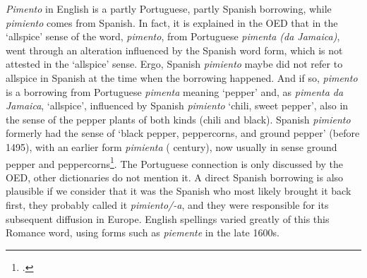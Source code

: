 \textit{Pimento} in English is a partly Portuguese, partly Spanish borrowing, while \textit{pimiento} comes from Spanish. In fact, it is explained in the \gls{OED} that in the `allspice' sense of the word, \textit{pimento}, from Portuguese \textit{pimenta (da Jamaica)}, went through an alteration influenced by the Spanish word form, which is not attested in the `allspice' sense. Ergo, Spanish \textit{pimiento} maybe did not refer to allspice in Spanish at the time when the borrowing happened. And if so, \textit{pimento} is a borrowing from Portuguese \textit{pimenta} meaning `pepper' and, as \textit{pimenta da Jamaica}, `allspice', influenced by Spanish \textit{pimiento} `chili, sweet pepper', also in the sense of the pepper plants of both kinds (chili and black). Spanish \textit{pimiento} formerly had the sense of `black pepper, peppercorns, and ground pepper' (before 1495), with an earlier form \textit{pimienta} ( century), now usually in sense ground pepper and peppercorns\footcite[pimento]{oed}. The Portuguese connection is only discussed by the \gls{OED}, other dictionaries do not mention it. A direct Spanish borrowing is also plausible if we consider that it was the Spanish who most likely brought it back first, they probably called it \textit{pimiento/-a}, and they were responsible for its subsequent diffusion in Europe. English spellings varied greatly of this this Romance word, using forms such as \textit{piemente} in the late 1600s. 

